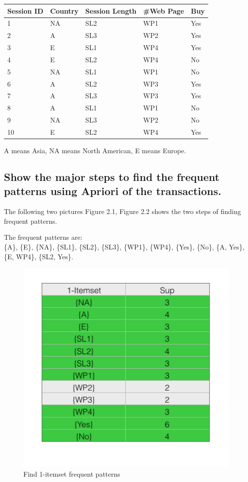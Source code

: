 \documentclass[paper=a4, fontsize=11pt]{scrartcl} %
\numberwithin{equation}{section} %
\numberwithin{figure}{section} %
\numberwithin{table}{section} %
\begin{document}
\begin{center}
    \begin{tabular}{|l|l|l|l|l|}
      \hline
      Session ID  & Country & Session Length & \#Web Page & Buy\\
      \hline
      1 & NA & SL2 & WP1 & Yes\\
      2 & A & SL3 & WP2 & Yes\\
      3 & E & SL1 & WP4 & Yes\\
      4 & E & SL2 & WP4 & No\\
      5 & NA & SL1 & WP1 & No\\
      6 & A & SL2 & WP3 & Yes\\
      7 & A & SL3 & WP3 & Yes\\
      8 & A & SL1 & WP1 & No\\
      9 & NA & SL3 & WP2 & No\\
      10 & E & SL2 & WP4 & Yes\\
      \hline
    \end{tabular}
\end{center}

A means Asia, NA means North American, E means Europe.

\subsection{Show the major steps to find the frequent patterns using Apriori of the transactions.}

The following two pictures Figure 2.1, Figure 2.2 shows the two steps of finding frequent patterns.

The frequent patterns are: \\
\{A\}, \{E\}, \{NA\}, \{SL1\}, \{SL2\}, \{SL3\}, \{WP1\}, \{WP4\}, \{Yes\}, \{No\}, 
\{A, Yes\}, \{E, WP4\}, \{SL2, Yes\}.

\begin{figure}[h]
    \centering
    \includegraphics[scale=0.4]{image1.png}
    \caption{Find 1-itemset frequent patterns}
\end{figure}
\end{document}
